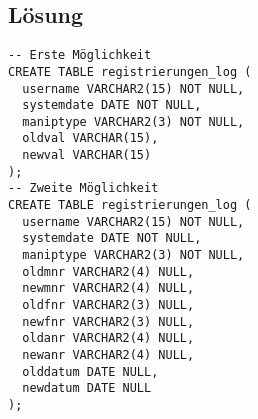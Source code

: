 \documentclass[a4paper,10pt,titlepage=false]{scrreprt}
\begin{document}
\subsection{Lösung}
\begin{lstlisting}[style=sql, title=Log-Tabelle]
-- Erste Möglichkeit
CREATE TABLE registrierungen_log (
  username VARCHAR2(15) NOT NULL,
  systemdate DATE NOT NULL,
  maniptype VARCHAR2(3) NOT NULL,
  oldval VARCHAR(15), 
  newval VARCHAR(15)
);
-- Zweite Möglichkeit
CREATE TABLE registrierungen_log (
  username VARCHAR2(15) NOT NULL,
  systemdate DATE NOT NULL,
  maniptype VARCHAR2(3) NOT NULL,
  oldmnr VARCHAR2(4) NULL,
  newmnr VARCHAR2(4) NULL,
  oldfnr VARCHAR2(3) NULL,
  newfnr VARCHAR2(3) NULL,
  oldanr VARCHAR2(4) NULL,
  newanr VARCHAR2(4) NULL,
  olddatum DATE NULL,
  newdatum DATE NULL
);
\end{lstlisting}
\end{document}
